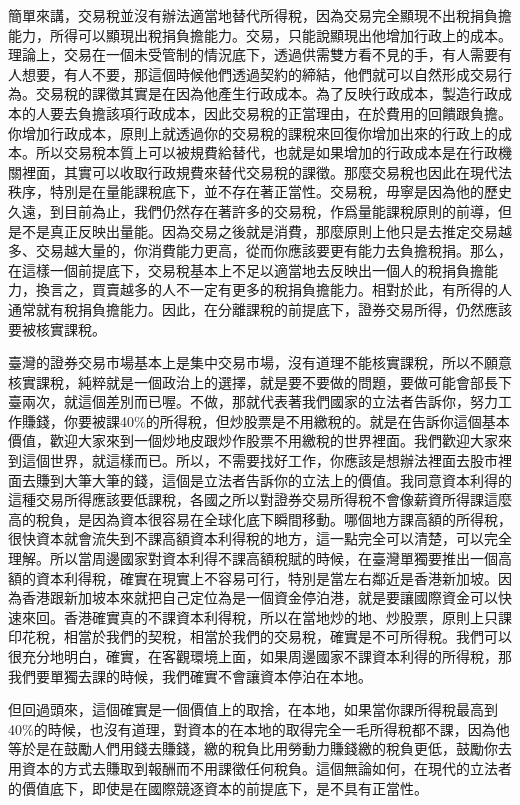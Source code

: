 \documentclass[]{ctexbook}
\begin{document}
簡單來講，交易稅並沒有辦法適當地替代所得稅，因為交易完全顯現不出稅捐負擔能力，所得可以顯現出稅捐負擔能力。交易，只能說顯現出他增加行政上的成本。理論上，交易在一個未受管制的情況底下，透過供需雙方看不見的手，有人需要有人想要，有人不要，那這個時候他們透過契約的締結，他們就可以自然形成交易行為。交易稅的課徵其實是在因為他產生行政成本。為了反映行政成本，製造行政成本的人要去負擔該項行政成本，因此交易稅的正當理由，在於費用的回饋跟負擔。你增加行政成本，原則上就透過你的交易稅的課稅來回復你增加出來的行政上的成本。所以交易稅本質上可以被規費給替代，也就是如果增加的行政成本是在行政機關裡面，其實可以收取行政規費來替代交易稅的課徵。那麼交易稅也因此在現代法秩序，特別是在量能課稅底下，並不存在著正當性。交易稅，毋寧是因為他的歷史久遠，到目前為止，我們仍然存在著許多的交易稅，作爲量能課稅原則的前導，但是不是真正反映出量能。因為交易之後就是消費，那麼原則上他只是去推定交易越多、交易越大量的，你消費能力更高，從而你應該要更有能力去負擔稅捐。那么，在這樣一個前提底下，交易稅基本上不足以適當地去反映出一個人的稅捐負擔能力，換言之，買賣越多的人不一定有更多的稅捐負擔能力。相對於此，有所得的人通常就有稅捐負擔能力。因此，在分離課稅的前提底下，證券交易所得，仍然應該要被核實課稅。

臺灣的證券交易市場基本上是集中交易市場，沒有道理不能核實課稅，所以不願意核實課稅，純粹就是一個政治上的選擇，就是要不要做的問題，要做可能會部長下臺兩次，就這個差別而已喔。不做，那就代表著我們國家的立法者告訴你，努力工作賺錢，你要被課40\%的所得稅，但炒股票是不用繳稅的。就是在告訴你這個基本價值，歡迎大家來到一個炒地皮跟炒作股票不用繳稅的世界裡面。我們歡迎大家來到這個世界，就這樣而已。所以，不需要找好工作，你應該是想辦法裡面去股市裡面去賺到大筆大筆的錢，這個是立法者告訴你的立法上的價值。我同意資本利得的這種交易所得應該要低課稅，各國之所以對證券交易所得稅不會像薪資所得課這麼高的稅負，是因為資本很容易在全球化底下瞬間移動。哪個地方課高額的所得稅，很快資本就會流失到不課高額資本利得稅的地方，這一點完全可以清楚，可以完全理解。所以當周邊國家對資本利得不課高額稅賦的時候，在臺灣單獨要推出一個高額的資本利得稅，確實在現實上不容易可行，特別是當左右鄰近是香港新加坡。因為香港跟新加坡本來就把自己定位為是一個資金停泊港，就是要讓國際資金可以快速來回。香港確實真的不課資本利得稅，所以在當地炒的地、炒股票，原則上只課印花稅，相當於我們的契稅，相當於我們的交易稅，確實是不可所得稅。我們可以很充分地明白，確實，在客觀環境上面，如果周邊國家不課資本利得的所得稅，那我們要單獨去課的時候，我們確實不會讓資本停泊在本地。

但回過頭來，這個確實是一個價值上的取捨，在本地，如果當你課所得稅最高到40\%的時候，也沒有道理，對資本的在本地的取得完全一毛所得稅都不課，因為他等於是在鼓勵人們用錢去賺錢，繳的稅負比用勞動力賺錢繳的稅負更低，鼓勵你去用資本的方式去賺取到報酬而不用課徵任何稅負。這個無論如何，在現代的立法者的價值底下，即使是在國際競逐資本的前提底下，是不具有正當性。
\end{document}

